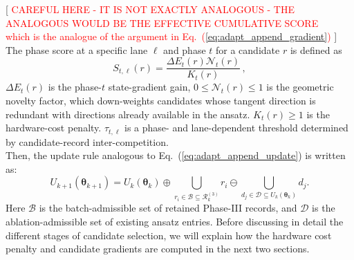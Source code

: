 \documentclass[
  reprint,
  amsmath,
  amssymb,
  aps,
  pra,
  nofootinbib,
  superscriptaddress,
  floatfix
]{revtex4-2}
\begin{document}
%
[
\textcolor{red}{CAREFUL HERE - IT IS NOT EXACTLY ANALOGOUS - THE ANALOGOUS WOULD BE THE EFFECTIVE CUMULATIVE SCORE\\
which is the analogue of the argument in Eq.~(\ref{eq:adapt_append_gradient})
}
]\\
The phase score at a specific lane \(\ell\) and phase \(t\) for a candidate \(r\) is defined as
%
\begin{equation}
S_{t,\ell}(r)
=
\frac{\Delta E_t(r)\mathcal N_t(r)}{K_t(r)}\,,
\label{eq:master_phase_score}
\end{equation}
$\Delta E_t(r)$ is the phase-$t$ state-gradient gain, $0\leq\mathcal N_t(r)\leq 1$ is the geometric novelty factor, which down-weights candidates whose tangent direction is redundant with directions already available in the ansatz. \(K_t(r) \geq 1\) is the hardware-cost penalty. \(\tau_{t,\ell}\) is a phase- and lane-dependent threshold determined by candidate-record inter-competition.\\
Then, the update rule analogous to Eq.~(\ref{eq:adapt_append_update}) is written as:
%
\begin{equation}
U_{k+1}(\boldsymbol\theta_{k+1})
=
U_k(\boldsymbol\theta_{k})
\oplus
\bigcup_{r_i\in\mathcal B\subseteq\mathcal R_k^{(3)}}r_i
\ominus
\bigcup_{d_j\in\mathcal D\subseteq U_k(\boldsymbol\theta_k)}d_j .
\label{eq:snake_ansatz_update}
\end{equation}
%
Here $\mathcal B$ is the batch-admissible set of retained Phase-III records, and $\mathcal D$ is the ablation-admissible set of existing ansatz entries. Before discussing in detail the different stages of candidate selection, we will explain how the hardware cost penalty and candidate gradients are computed in the next two sections.
\end{document}
